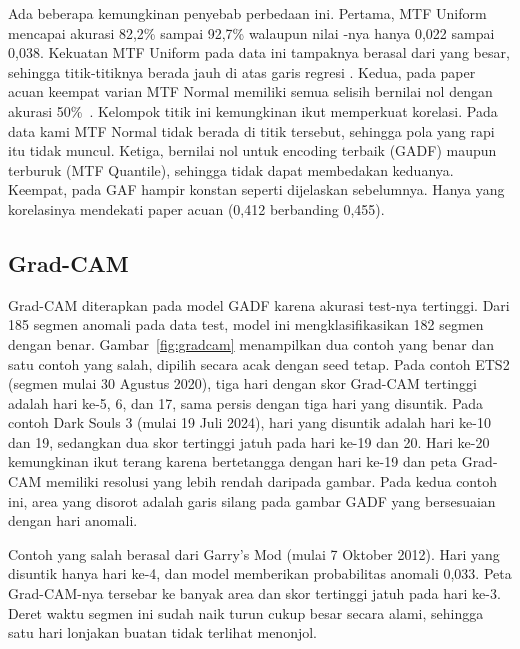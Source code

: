 Ada beberapa kemungkinan penyebab perbedaan ini. Pertama, MTF Uniform mencapai akurasi 82,2\% sampai 92,7\% walaupun nilai \dsd-nya hanya 0,022 sampai 0,038. Kekuatan MTF Uniform pada data ini tampaknya berasal dari \dmean{} yang besar, sehingga titik-titiknya berada jauh di atas garis regresi \dsd. Kedua, pada paper acuan keempat varian MTF Normal memiliki semua selisih bernilai nol dengan akurasi 50\%~\cite{rahadian2023}. Kelompok titik ini kemungkinan ikut memperkuat korelasi. Pada data kami MTF Normal tidak berada di titik tersebut, sehingga pola yang rapi itu tidak muncul. Ketiga, \dmean{} bernilai nol untuk encoding terbaik (GADF) maupun terburuk (MTF Quantile), sehingga \dmean{} tidak dapat membedakan keduanya. Keempat, \dcount{} pada GAF hampir konstan seperti dijelaskan sebelumnya. Hanya \dcount{} yang korelasinya mendekati paper acuan (0,412 berbanding 0,455).

\subsection{Grad-CAM}

Grad-CAM diterapkan pada model GADF karena akurasi test-nya tertinggi. Dari 185 segmen anomali pada data test, model ini mengklasifikasikan 182 segmen dengan benar. Gambar~\ref{fig:gradcam} menampilkan dua contoh yang benar dan satu contoh yang salah, dipilih secara acak dengan seed tetap. Pada contoh ETS2 (segmen mulai 30 Agustus 2020), tiga hari dengan skor Grad-CAM tertinggi adalah hari ke-5, 6, dan 17, sama persis dengan tiga hari yang disuntik. Pada contoh Dark Souls 3 (mulai 19 Juli 2024), hari yang disuntik adalah hari ke-10 dan 19, sedangkan dua skor tertinggi jatuh pada hari ke-19 dan 20. Hari ke-20 kemungkinan ikut terang karena bertetangga dengan hari ke-19 dan peta Grad-CAM memiliki resolusi yang lebih rendah daripada gambar. Pada kedua contoh ini, area yang disorot adalah garis silang pada gambar GADF yang bersesuaian dengan hari anomali.

Contoh yang salah berasal dari Garry's Mod (mulai 7 Oktober 2012). Hari yang disuntik hanya hari ke-4, dan model memberikan probabilitas anomali 0,033. Peta Grad-CAM-nya tersebar ke banyak area dan skor tertinggi jatuh pada hari ke-3. Deret waktu segmen ini sudah naik turun cukup besar secara alami, sehingga satu hari lonjakan buatan tidak terlihat menonjol.
